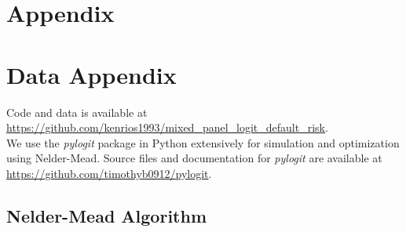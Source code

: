 \documentclass[12pt]{article}
\begin{document}
\clearpage


\appendix
\section*{Appendix}


\newpage

\section*{Data Appendix} \label{sec:data appendix}

Code and data is available at \url{https://github.com/kenrios1993/mixed_panel_logit_default_risk}. \\
We use the \textit{pylogit} package in Python extensively for simulation and optimization using Nelder-Mead. Source files and documentation for \textit{pylogit} are available at \url{https://github.com/timothyb0912/pylogit}.

\subsection*{Nelder-Mead Algorithm}
\end{document}
